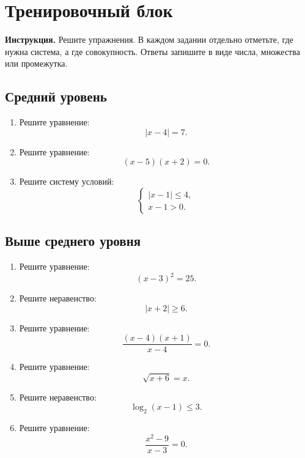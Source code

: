 \documentclass[a4paper,12pt]{article}
\begin{document}
\newpage

\section*{Тренировочный блок}

\textbf{Инструкция.} Решите упражнения. В каждом задании отдельно отметьте, где нужна система, а где совокупность. Ответы запишите в виде числа, множества или промежутка.

\subsection*{Средний уровень}

\begin{enumerate}
    \item Решите уравнение:
    \[
    |x-4|=7.
    \]

    \item Решите уравнение:
    \[
    (x-5)(x+2)=0.
    \]

    \item Решите систему условий:
    \[
    \begin{cases}
    |x-1|\le 4,\\
    x-1>0.
    \end{cases}
    \]
\end{enumerate}

\subsection*{Выше среднего уровня}

\begin{enumerate}[resume]
    \item Решите уравнение:
    \[
    (x-3)^2=25.
    \]

    \item Решите неравенство:
    \[
    |x+2|\ge 6.
    \]

    \item Решите уравнение:
    \[
    \frac{(x-4)(x+1)}{x-4}=0.
    \]

    \item Решите уравнение:
    \[
    \sqrt{x+6}=x.
    \]

    \item Решите неравенство:
    \[
    \log_2(x-1)\le 3.
    \]

    \item Решите уравнение:
    \[
    \frac{x^2-9}{x-3}=0.
    \]
\end{enumerate}
\end{document}
